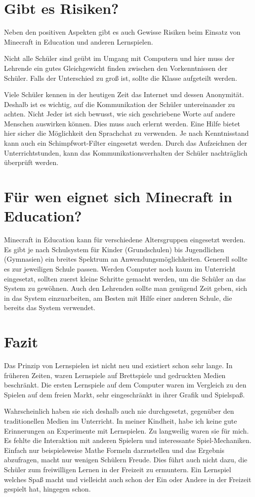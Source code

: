 \section{Gibt es Risiken?}

Neben den positiven Aspekten gibt es auch Gewisse Risiken beim Einsatz von Minecraft in Education und anderen Lernspielen.

Nicht alle Schüler sind geübt im Umgang mit Computern und hier muss der Lehrende ein gutes Gleichgewicht finden zwischen den Vorkenntnissen der Schüler. Falls der Unterschied zu groß ist, sollte die Klasse aufgeteilt werden.

Viele Schüler kennen in der heutigen Zeit das Internet und dessen Anonymität. Deshalb ist es wichtig, auf die Kommunikation der Schüler untereinander zu achten. Nicht Jeder ist sich bewusst, wie sich geschriebene Worte auf andere Menschen auswirken können. Dies muss auch erlernt werden. Eine Hilfe bietet hier sicher die Möglichkeit den Sprachchat zu verwenden. Je nach Kenntnisstand kann auch ein Schimpfwort-Filter eingesetzt werden. Durch das Aufzeichnen der Unterrichtstunden, kann das Kommunikationsverhalten der Schüler nachträglich überprüft werden.

\section{Für wen eignet sich Minecraft in Education?}
Minecraft in Education kann für verschiedene Altersgruppen eingesetzt werden. Es gibt je nach Schulsystem für Kinder (Grundschulen) bis Jugendlichen (Gymnasien) ein breites Spektrum an Anwendungsmöglichkeiten. Generell sollte es zur jeweiligen Schule passen. Werden Computer noch kaum im Unterricht eingesetzt, sollten zuerst kleine Schritte gemacht werden, um die Schüler an das System zu gewöhnen.
Auch den Lehrenden sollte man genügend Zeit geben, sich in das System einzuarbeiten, am Besten mit Hilfe einer anderen Schule, die bereits das System verwendet.

\section{Fazit}
Das Prinzip von Lernspielen ist nicht neu und existiert schon sehr lange. In früheren Zeiten, waren Lernspiele auf Brettspiele und gedruckten Medien beschränkt. Die ersten Lernspiele auf dem Computer waren im Vergleich zu den Spielen auf dem freien Markt, sehr eingeschränkt in ihrer Grafik und Spielspaß. 

Wahrscheinlich haben sie sich deshalb auch nie durchgesetzt, gegenüber den traditionellen Medien im Unterricht.
In meiner Kindheit, habe ich keine gute Erinnerungen an Experimente mit Lernspielen. Zu langweilig waren sie für mich. Es fehlte die Interaktion mit anderen Spielern und interessante Spiel-Mechaniken. Einfach nur beispielsweise Mathe Formeln darzustellen und das Ergebnis abzufragen, macht nur wenigen Schülern Freude. Dies führt auch nicht dazu, die Schüler zum freiwilligen Lernen in der Freizeit zu ermuntern. Ein Lernspiel welches Spaß macht und vielleicht auch schon der Ein oder Andere in der Freizeit gespielt hat, hingegen schon.

